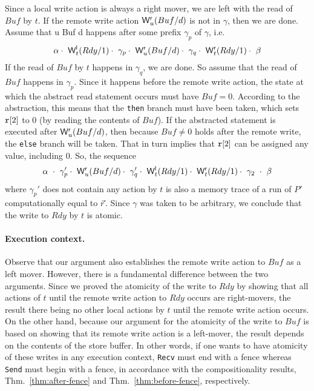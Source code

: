 Since a local write action is always a right mover, we are left with the read of $Buf$ by $t$.
If the remote write action $\mathsf{W}^{\mathsf{r}}_{u}(Buf/d)$ is not in $\gamma$, then we are done.
Assume that \remwritex u {Buf} d happens after some prefix $\gamma_p$ of $\gamma$, i.e.
{\small
\[
\alpha\cdot\ \locwritex t {Rdy} 1\cdot\ \gamma_p\cdot\ \remwritex u {Buf} d\cdot\ \gamma_q\cdot\ \remwritex t {Rdy} 1\cdot\ \beta
\]
}
If the read of $Buf$ by $t$ happens in $\gamma_q$, we are done.
So assume that the read of $Buf$ happens in $\gamma_p$.
Since it happens before the remote write action, the state at which the abstract read statement occurs must have $Buf=0$.
According to the abstraction, this means that the {\tt then} branch must have been taken, which sets $\mathtt{r}[2]$ to 0 (by reading the contents of $Buf$).
If the abstracted statement is executed after $\mathsf{W}^{\mathsf{r}}_{u}(Buf/d)$, then because $Buf\neq 0$ holds after the remote write, the {\tt else} branch will be taken.
That in turn implies that $\mathtt{r}[2]$ can be assigned any value, including 0. 
So, the sequence
\[
\alpha\ \cdot\ \gamma_p'\cdot\ \remwritex u {Buf} d\cdot\ \gamma_q'\cdot\ \locwritex t {Rdy} 1\cdot\ \remwritex t {Rdy} 1\cdot\ \gamma_2\ \cdot\ \beta
\]
where $\gamma_p'$ does not contain any action by $t$ is also a memory trace of a run of $P'$ computationally equal to $\vec{r}$.
Since $\gamma$ was taken to be arbitrary, we conclude that the write to $Rdy$ by $t$ is atomic.

\paragraph{Execution context.}
Observe that our argument also establishes the remote write action to $Buf$ as a left mover. 
However, there is a fundamental difference between the two arguments.
Since we proved the atomicity of the write to $Rdy$ by showing that all actions of $t$ until the remote write action to $Rdy$ occurs are right-movers, the result there being no other local actions by $t$ until the remote write action occurs. 
On the other hand, because our argument for the atomicity of the write to $Buf$ is based on showing that its remote write action is a left-mover, the result depends on the contents of the store buffer. 
In other words, if one wants to have atomicity of these writes in any execution context, {\tt Recv} must end with a fence whereas {\tt Send} must begin with a fence, in accordance with the compositionality results, Thm.~\ref{thm:after-fence} and Thm.~\ref{thm:before-fence}, respectively.

